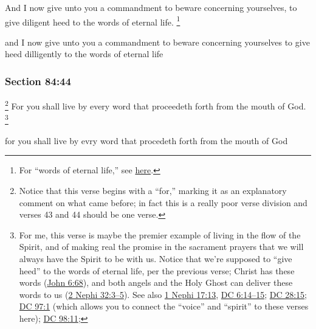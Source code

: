 		And I now give unto you a commandment to beware concerning yourselves, to give diligent heed to the words of eternal life.%
			\footnote{%
				For ``words of eternal life,'' see \hyperref[ETERNITY-PHRASES]{here}.
				}

		\begin{framed}
		\scriptsize
			\begin{compactdesc}
				\item[JSP] and I now give unto you a commandment to beware concerning yourselves to give heed dilligently to the words of eternal life
			\end{compactdesc}
		\end{framed}

	\subsubsection{Section 84:44} %
		\label{DC84-44}

			\footnote{%
				Notice that this verse begins with a ``for,'' marking it as an explanatory comment on what came before; in fact this is a really poor verse division and verses 43 and 44 should be one verse.
				}%
		For you shall live by every word that proceedeth forth from the mouth of God.%
			\footnote{%
				For me, this verse is maybe the premier example of living in the flow of the Spirit, and of making real the promise in the sacrament prayers that we will always have the Spirit to be with us. Notice that we're supposed to ``give heed'' to the words of eternal life, per the previous verse; Christ has these words (\hyperref[JOHN-6-68]{John 6:68}), and both angels and the Holy Ghost can deliver these words to us (\hyperref[2NEPHI-32-3]{2 Nephi 32:3--5}). See also \hyperref[1NEPHI-17-13]{1 Nephi 17:13}, \hyperref[DC6-14]{DC 6:14--15}; \hyperref[DC28-15]{DC 28:15}; \hyperref[DC97-1]{DC 97:1} (which allows you to connect the ``voice'' and ``spirit'' to these verses here); \hyperref[DC98-11]{DC 98:11}; 
				}

		\begin{framed}
		\scriptsize
			\begin{compactdesc}
				\item[JSP] for you shall live by evry word that procedeth forth from the mouth of God
			\end{compactdesc}
		\end{framed}

